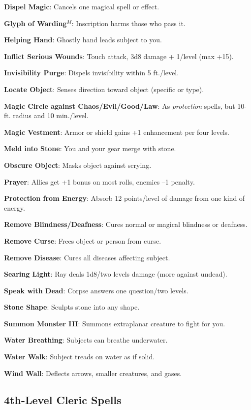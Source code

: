 \textbf{Dispel Magic}: Cancels one magical spell or effect.

\textbf{Glyph of Warding}\(^{M}\): Inscription harms those who pass it.

\textbf{Helping Hand}: Ghostly hand leads subject to you.

\textbf{Inflict Serious Wounds}: Touch attack, 3d8 damage + 1/level (max +15).

\textbf{Invisibility Purge}: Dispels invisibility within 5 ft./level.

\textbf{Locate Object}: Senses direction toward object (specific or type).

\textbf{Magic Circle against Chaos/Evil/Good/Law}: As \textit{protection }spells, but 10-ft. radius and 10 min./level.

\textbf{Magic Vestment}: Armor or shield gains +1 enhancement per four levels.

\textbf{Meld into Stone}: You and your gear merge with stone.

\textbf{Obscure Object}: Masks object against scrying.

\textbf{Prayer}: Allies get +1 bonus on most rolls, enemies --1 penalty.

\textbf{Protection from Energy}: Absorb 12 points/level of damage from one kind of energy.

\textbf{Remove Blindness/Deafness}: Cures normal or magical blindness or deafness.

\textbf{Remove Curse}: Frees object or person from curse.

\textbf{Remove Disease}: Cures all diseases affecting subject.

\textbf{Searing Light}: Ray deals 1d8/two levels damage (more against undead).

\textbf{Speak with Dead}: Corpse answers one question/two levels.

\textbf{Stone Shape}: Sculpts stone into any shape.

\textbf{Summon Monster III}: Summons extraplanar creature to fight for you.

\textbf{Water Breathing}: Subjects can breathe underwater.

\textbf{Water Walk}: Subject treads on water as if solid.

\textbf{Wind Wall}: Deflects arrows, smaller creatures, and gases.

\subsection{4th-Level Cleric Spells}


